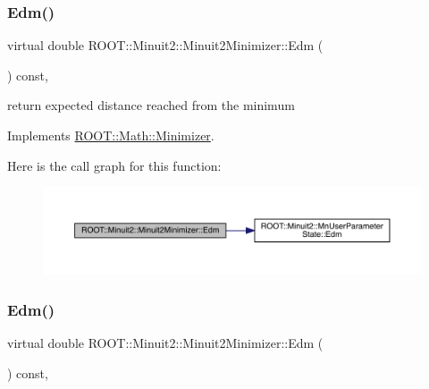\subsubsection{\texorpdfstring{Edm()}{Edm()}\hspace{0.1cm}{\footnotesize\ttfamily [1/2]}}
{\footnotesize\ttfamily virtual double R\+O\+O\+T\+::\+Minuit2\+::\+Minuit2\+Minimizer\+::\+Edm (\begin{DoxyParamCaption}{ }\end{DoxyParamCaption}) const\hspace{0.3cm}{\ttfamily [inline]}, {\ttfamily [virtual]}}



return expected distance reached from the minimum 



Implements \mbox{\hyperlink{classROOT_1_1Math_1_1Minimizer_a990c6935849a3fb31aedab1df6c26f28}{R\+O\+O\+T\+::\+Math\+::\+Minimizer}}.

Here is the call graph for this function\+:
\nopagebreak
\begin{figure}[H]
\begin{center}
\leavevmode
\includegraphics[width=350pt]{d0/d9c/classROOT_1_1Minuit2_1_1Minuit2Minimizer_ab9c1bfaaaf4c12acd1fd96ece3509269_cgraph}
\end{center}
\end{figure}
\mbox{\label{classROOT_1_1Minuit2_1_1Minuit2Minimizer_ab9c1bfaaaf4c12acd1fd96ece3509269}} 
\subsubsection{\texorpdfstring{Edm()}{Edm()}\hspace{0.1cm}{\footnotesize\ttfamily [2/2]}}
{\footnotesize\ttfamily virtual double R\+O\+O\+T\+::\+Minuit2\+::\+Minuit2\+Minimizer\+::\+Edm (\begin{DoxyParamCaption}{ }\end{DoxyParamCaption}) const\hspace{0.3cm}{\ttfamily [inline]}, {\ttfamily [virtual]}}




